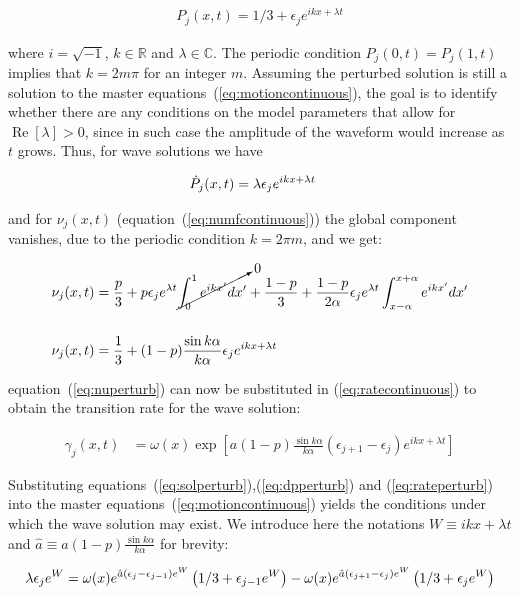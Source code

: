 \begin{align}
  P_j(x,t) = 1/3 + \epsilon_j e^{ikx + \lambda t}
  \label{eq:solperturb}
\end{align}

\noindent where $i=\sqrt{-1}$, $k\in\mathbb{R}$ and $\lambda\in\mathbb{C}$. The periodic condition $P_j(0,t) = P_j(1,t)$ implies that
$k=2m\pi$ for an integer $m$. Assuming the perturbed solution is still a solution to the master equations~(\ref{eq:motioncontinuous}),
the goal is to identify whether there are any conditions on the model parameters that allow for $\operatorname{Re}[\lambda]>0$, since
in such case the amplitude of the waveform would increase as $t$ grows. Thus, for wave solutions we have

\begin{align}
  \dot{P}_j(x,t) &= \lambda\epsilon_j e^{ikx + \lambda t}
  \label{eq:dpperturb}
\end{align}

\noindent and for $\nu_j(x,t)$ (equation~(\ref{eq:numfcontinuous})) the global component vanishes, due to the periodic condition
$k=2\pi m$, and we get:

\begin{align}
  \nu_j(x,t) &= \frac{p}{3} + p\epsilon_je^{\lambda t}\cancelto{0}{\int_0^1 e^{ikx'}dx'} +
  \frac{1-p}{3} + \frac{1-p}{2\alpha} \epsilon_je^{\lambda t}\int_{x-\alpha}^{x+\alpha}e^{ikx'}dx' \notag\\[14pt]
  \nu_j(x,t) &= \frac{1}{3} + (1-p)\frac{\sin k\alpha}{k\alpha}\epsilon_je^{ikx+\lambda t}
  \label{eq:nuperturb}
\end{align}

\noindent equation~(\ref{eq:nuperturb}) can now be substituted in (\ref{eq:ratecontinuous}) to obtain the transition rate for the wave
solution:

\begin{align}
  \gamma_j(x,t) &= \omega(x)\exp\left[ a(1-p)\frac{\sin k\alpha}{k\alpha}(\epsilon_{j+1}-\epsilon_j)e^{ikx+\lambda t} \right]
  \label{eq:rateperturb}
\end{align}

Substituting equations~(\ref{eq:solperturb}),(\ref{eq:dpperturb}) and (\ref{eq:rateperturb}) into the master
equations~(\ref{eq:motioncontinuous}) yields the conditions under which the wave solution may exist. We introduce here the notations
$W\equiv ikx + \lambda t$ and $\hat{a}\equiv a(1-p)\frac{\sin k\alpha}{k\alpha}$ for brevity:

\begin{align}
  \lambda \epsilon_je^W = \omega(x)e^{\hat{a}(\epsilon_j-\epsilon_{j-1})e^W}\left(1/3+\epsilon_{j-1}e^W\right)
  - \omega(x)e^{\hat{a}(\epsilon_{j+1}-\epsilon_j)e^W}\left(1/3+\epsilon_je^W\right) \notag
\end{align}

